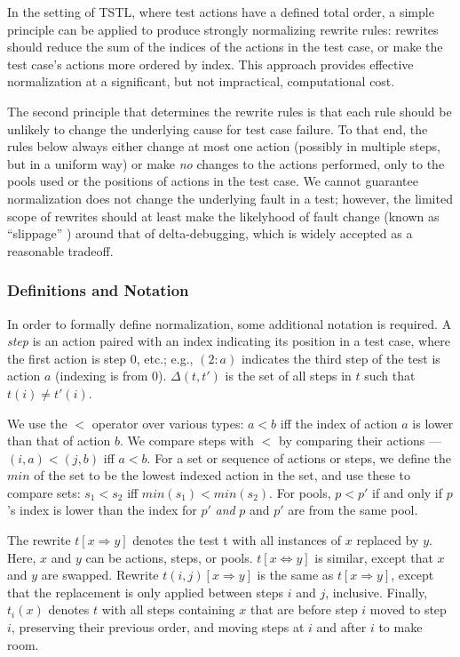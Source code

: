 In the setting of TSTL, where test actions have a defined total
order, a simple principle can be applied to produce strongly
normalizing rewrite rules: rewrites should reduce the sum of the
indices of the actions in the test case, or make the test case's
actions more ordered by index.  This approach
provides effective normalization at a significant, but not
impractical, computational cost.

The second principle that determines the rewrite rules is that each
rule should be unlikely to change the underlying cause for test case
failure.  To that end, the rules below always either change at most
one action (possibly in multiple steps, but in a uniform way) or make
\emph{no} changes to the actions performed, only to the pools used or the
positions of actions in the test case.  We cannot guarantee
normalization does not change the underlying fault in a test; however,
the limited scope of rewrites should at least make the likelyhood of
fault change (known as ``slippage'' \cite{PLDI13}) around that of
delta-debugging, which is widely accepted as a reasonable tradeoff.

\subsubsection{Definitions and Notation}

In order to formally define normalization, some additional notation is required.
A \emph{step} is an action paired with an index indicating its
position in a test case,
where the first action is step 0, etc.; e.g., $(2: a)$ indicates the
third step of the test is action $a$ (indexing is from 0). 
$\Delta(t,t')$ is the set of all steps in $t$ such that $t(i) \not= t'(i)$.

We use the $<$ operator over various types:
$a < b$ iff the index of action $a$ is lower
than that of action $b$.  We compare steps with $<$ by comparing their
actions --- $(i,a) < (j,b)$ iff $a < b$.  For a set or sequence of actions or steps, we define the $min$ of the
set to be the lowest indexed action in the set, and use
these to compare sets:  $s_1 < s_2$ iff $min(s_1) < min(s_2)$. For pools,
$p < p'$ if and only if $p$'s index is lower than the index for $p'$
\emph{and} $p$ and $p'$ are from the same pool.

The rewrite $t[x \Rightarrow y]$ denotes the test t with all instances of $x$
replaced by $y$.  Here, $x$ and $y$ can be actions, steps, or pools.
$t[x \Leftrightarrow y]$ is similar, except that $x$ and $y$ are
swapped.  Rewrite $t(i,j)[x \Rightarrow y]$ is the same as $t[x \Rightarrow
y]$, except that the replacement is only applied between steps $i$ and
$j$, inclusive.  Finally, $t_i(x)$ denotes $t$ with all steps
containing $x$ that are before step $i$ moved to step $i$, preserving
their previous order, and moving steps at $i$ and after $i$ to make room.

